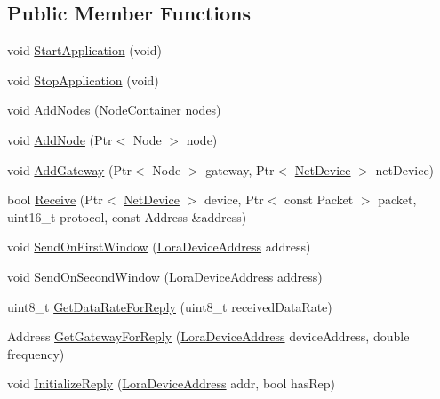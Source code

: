 \subsection*{Public Member Functions}
\begin{DoxyCompactItemize}
\item 
void \hyperlink{classns3_1_1lorawan_1_1SimpleNetworkServer_a3afe1b0a9cb2353cba11aacbd07c4de4}{Start\+Application} (void)
\item 
void \hyperlink{classns3_1_1lorawan_1_1SimpleNetworkServer_a95b9553d1da0447ca28f12e615a959d5}{Stop\+Application} (void)
\item 
void \hyperlink{classns3_1_1lorawan_1_1SimpleNetworkServer_a52ff4184ec4b21340772cdcb22ac9b79}{Add\+Nodes} (Node\+Container nodes)
\item 
void \hyperlink{classns3_1_1lorawan_1_1SimpleNetworkServer_ad1cb1d6e83af9a6ee38fd0481a94cd36}{Add\+Node} (Ptr$<$ Node $>$ node)
\item 
void \hyperlink{classns3_1_1lorawan_1_1SimpleNetworkServer_ae4c1abffbbac9ea1eae37371d14b454c}{Add\+Gateway} (Ptr$<$ Node $>$ gateway, Ptr$<$ \hyperlink{classNetDevice}{Net\+Device} $>$ net\+Device)
\item 
bool \hyperlink{classns3_1_1lorawan_1_1SimpleNetworkServer_a0cfe7b758c095ac9bc87af7c856990ac}{Receive} (Ptr$<$ \hyperlink{classNetDevice}{Net\+Device} $>$ device, Ptr$<$ const Packet $>$ packet, uint16\+\_\+t protocol, const Address \&address)
\item 
void \hyperlink{classns3_1_1lorawan_1_1SimpleNetworkServer_ac74989ada880eb1f0fc8501e70a16d9a}{Send\+On\+First\+Window} (\hyperlink{classns3_1_1lorawan_1_1LoraDeviceAddress}{Lora\+Device\+Address} address)
\item 
void \hyperlink{classns3_1_1lorawan_1_1SimpleNetworkServer_af239dffde45d81825fc4bcee31be055a}{Send\+On\+Second\+Window} (\hyperlink{classns3_1_1lorawan_1_1LoraDeviceAddress}{Lora\+Device\+Address} address)
\item 
uint8\+\_\+t \hyperlink{classns3_1_1lorawan_1_1SimpleNetworkServer_a900b4cf2a982ada33ea1460421077902}{Get\+Data\+Rate\+For\+Reply} (uint8\+\_\+t received\+Data\+Rate)
\item 
Address \hyperlink{classns3_1_1lorawan_1_1SimpleNetworkServer_a40e560ebb7d259465369b50118b72715}{Get\+Gateway\+For\+Reply} (\hyperlink{classns3_1_1lorawan_1_1LoraDeviceAddress}{Lora\+Device\+Address} device\+Address, double frequency)
\item 
void \hyperlink{classns3_1_1lorawan_1_1SimpleNetworkServer_a64d56f6364faa25617b28f77dbb659ee}{Initialize\+Reply} (\hyperlink{classns3_1_1lorawan_1_1LoraDeviceAddress}{Lora\+Device\+Address} addr, bool has\+Rep)
\end{DoxyCompactItemize}
